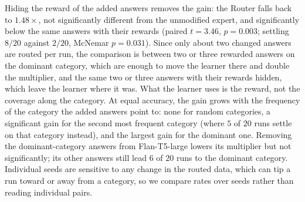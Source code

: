 \documentclass[anon]{alt2027} %
\begin{document}
\begin{table}[h]
\centering
\caption{Changing $15$ of the expert's $10{,}000$ held-out answers. Tests are
paired over $20$ seeds against the unmodified expert: a paired $t$-test on
Router accuracy and an exact McNemar test on whether the run settles on
$1471$.}
\label{tab:inject}
\small
\setlength{\tabcolsep}{4pt}
\end{table}

Hiding the reward of the added answers removes the gain: the Router falls
back to $1.48\times$, not significantly different from the unmodified expert,
and significantly below the same answers with their rewards (paired $t=3.46$,
$p=0.003$; settling $8/20$ against $2/20$, McNemar $p=0.031$). Since only
about two changed answers are routed per run, the comparison is between two
or three rewarded answers on the dominant category, which are enough to move
the learner there and double the multiplier, and the same two or three
answers with their rewards hidden, which leave the learner where it was. What
the learner uses is the reward, not the coverage along the category. At equal
accuracy, the gain grows with the frequency of the category the
added answers point to: none for random categories, a significant gain for
the second most frequent category (where $5$ of $20$ runs settle on that
category instead), and the largest gain for the dominant one. Removing the
dominant-category answers from Flan-T5-large lowers its multiplier but not
significantly; its other answers still lead $6$ of $20$ runs to the
dominant category. Individual seeds are sensitive to any change in the
routed data, which can tip a run toward or away from a category, so we
compare rates over seeds rather than reading individual pairs.
\end{document}
